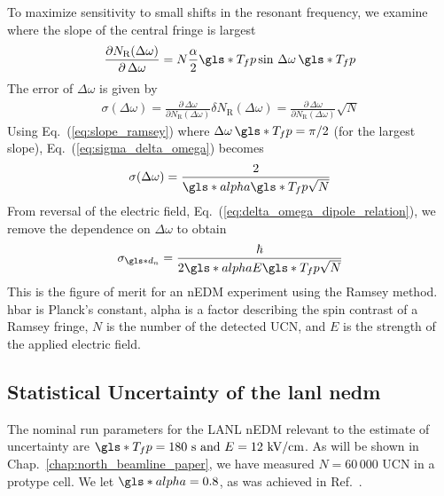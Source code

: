 To maximize sensitivity to small shifts in the resonant frequency, we examine where the slope of the central fringe is largest
%
\begin{gather}
    \frac{\partial N_\text{R}(\Delta \omega)}{\partial \, \Delta \omega} = N \frac{\alpha}{2} \gls*{T_fp} \sin \, \Delta \omega \, \gls*{T_fp} \label{eq:slope_ramsey}
\end{gather}
%
The error of $\Delta \omega$ is given by
%
\begin{gather}
    \sigma(\Delta \omega) = \frac{\partial \, \Delta \omega}{\partial N_\text{R}(\Delta \omega)}\delta N_\text{R}(\Delta \omega) = \frac{\partial \, \Delta \omega}{\partial N_\text{R}(\Delta \omega)} \sqrt{N}
    \label{eq:sigma_delta_omega}
\end{gather}
%
Using Eq.~(\ref{eq:slope_ramsey}) where $\Delta \omega \, \gls*{T_fp} = \pi/2$ (for the largest slope), Eq.~(\ref{eq:sigma_delta_omega}) becomes
%
\begin{gather}
    \sigma(\Delta \omega) = \frac{2}{\gls*{alpha} \gls*{T_fp} \sqrt{N}}
\end{gather}
%
From reversal of the electric field, Eq.~(\ref{eq:delta_omega_dipole_relation}), we remove the dependence on $\Delta\omega$ to obtain
%
\begin{gather}
    \sigma_{\gls*{d_n}} = \frac{\hbar}{2\gls*{alpha} E \gls*{T_fp} \sqrt{N}}\label{eq:figure_of_merit}
\end{gather}
%
This is the figure of merit for an nEDM experiment using the Ramsey method. \gls{hbar} is Planck’s constant, \gls{alpha} is a factor describing the spin contrast of a Ramsey fringe, $N$ is the number of the detected UCN, and $E$ is the strength of the applied electric field.


\subsection
{
    \texorpdfstring{Statistical Uncertainty of the \acrshort{lanl} \acrshort{nedm}}
                    {Statistical Uncertainty of the LANL nEDM}\label{sec:lanl_nedm_uncertainty}
}


The nominal run parameters for the LANL nEDM relevant to the estimate of uncertainty are $\gls*{T_fp}=180\text{ s and } E=12\text{ kV/cm}$. As will be shown in Chap.~\ref{chap:north_beamline_paper}, we have measured $N=60\,000\text{ UCN}$ in a protype cell. We let $\gls*{alpha}=0.8$, as was achieved in Ref.~\cite{ABE20}.


